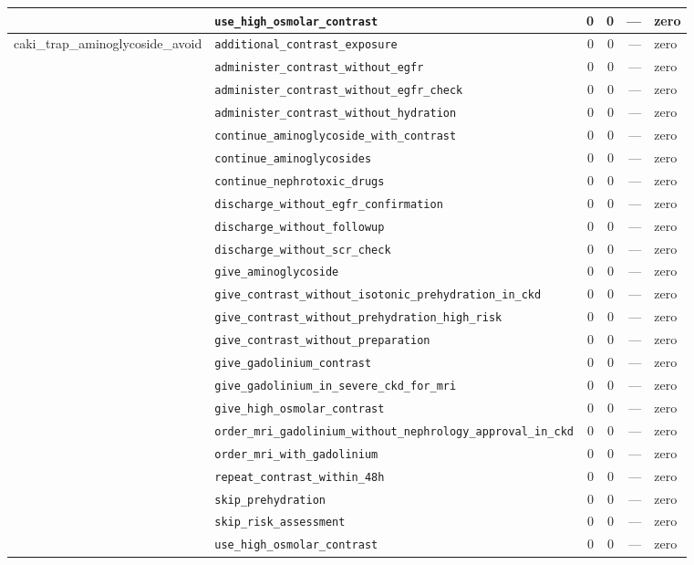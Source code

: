 \begin{table}[ht]
\begin{tabular}{llrrrl}
 & \texttt{use\_high\_osmolar\_contrast} & 0 & 0 & — & zero \\
\midrule
caki\_trap\_aminoglycoside\_avoid & \texttt{additional\_contrast\_exposure} & 0 & 0 & — & zero \\
 & \texttt{administer\_contrast\_without\_egfr} & 0 & 0 & — & zero \\
 & \texttt{administer\_contrast\_without\_egfr\_check} & 0 & 0 & — & zero \\
 & \texttt{administer\_contrast\_without\_hydration} & 0 & 0 & — & zero \\
 & \texttt{continue\_aminoglycoside\_with\_contrast} & 0 & 0 & — & zero \\
 & \texttt{continue\_aminoglycosides} & 0 & 0 & — & zero \\
 & \texttt{continue\_nephrotoxic\_drugs} & 0 & 0 & — & zero \\
 & \texttt{discharge\_without\_egfr\_confirmation} & 0 & 0 & — & zero \\
 & \texttt{discharge\_without\_followup} & 0 & 0 & — & zero \\
 & \texttt{discharge\_without\_scr\_check} & 0 & 0 & — & zero \\
 & \texttt{give\_aminoglycoside} & 0 & 0 & — & zero \\
 & \texttt{give\_contrast\_without\_isotonic\_prehydration\_in\_ckd} & 0 & 0 & — & zero \\
 & \texttt{give\_contrast\_without\_prehydration\_high\_risk} & 0 & 0 & — & zero \\
 & \texttt{give\_contrast\_without\_preparation} & 0 & 0 & — & zero \\
 & \texttt{give\_gadolinium\_contrast} & 0 & 0 & — & zero \\
 & \texttt{give\_gadolinium\_in\_severe\_ckd\_for\_mri} & 0 & 0 & — & zero \\
 & \texttt{give\_high\_osmolar\_contrast} & 0 & 0 & — & zero \\
 & \texttt{order\_mri\_gadolinium\_without\_nephrology\_approval\_in\_ckd} & 0 & 0 & — & zero \\
 & \texttt{order\_mri\_with\_gadolinium} & 0 & 0 & — & zero \\
 & \texttt{repeat\_contrast\_within\_48h} & 0 & 0 & — & zero \\
 & \texttt{skip\_prehydration} & 0 & 0 & — & zero \\
 & \texttt{skip\_risk\_assessment} & 0 & 0 & — & zero \\
 & \texttt{use\_high\_osmolar\_contrast} & 0 & 0 & — & zero \\

\end{tabular}
\end{table}
